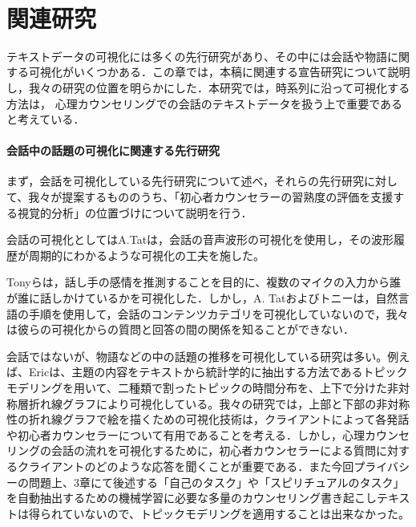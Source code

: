\documentclass[shuuron]{kuee}
\begin{document}





　

\chapter{関連研究}






  テキストデータの可視化には多くの先行研究があり、その中には会話や物語に関する可視化がいくつかある．この章では，本稿に関連する宣告研究について説明し，我々の研究の位置を明らかにした．本研究では，時系列に沿って可視化する方法は， 心理カウンセリングでの会話のテキストデータを扱う上で重要であると考えている．





\subsubsection{会話中の話題の可視化に関連する先行研究}

まず，会話を可視化している先行研究について述べ，それらの先行研究に対して、我々が提案するもののうち、「初心者カウンセラーの習熟度の評価を支援する視覚的分析」の位置づけについて説明を行う．




  会話の可視化としてはA.Tat\cite{tat2002visualising}は，会話の音声波形の可視化を使用し，その波形履歴が周期的にわかるような可視化の工夫を施した。

Tonyら\cite{bergstrom2007seeing}は，話し手の感情を推測することを目的に、複数のマイクの入力から誰が誰に話しかけているかを可視化した．しかし，A. Tatおよびトニーは，自然言語の手順を使用して，会話のコンテンツカテゴリを可視化していないので，我々は彼らの可視化からの質問と回答の間の関係を知ることができない．


会話ではないが、物語などの中の話題の推移を可視化している研究は多い。例えば、Eric\cite{taskdriven}は、主題の内容をテキストから統計学的に抽出する方法であるトピックモデリングを用いて、二種類で割ったトピックの時間分布を、上下で分けた非対称層折れ線グラフにより可視化している。我々の研究では，上部と下部の非対称性の折れ線グラフで絵を描くための可視化技術は，クライアントによって各発話や初心者カウンセラーについて有用であることを考える．しかし，心理カウンセリングの会話の流れを可視化するために，初心者カウンセラーによる質問に対するクライアントのどのような応答を聞くことが重要である．また今回プライバシーの問題上、3章にて後述する「自己のタスク」や「スピリチュアルのタスク」を自動抽出するための機械学習に必要な多量のカウンセリング書き起こしテキストは得られていないので、トピックモデリングを適用することは出来なかった。
\end{document}
